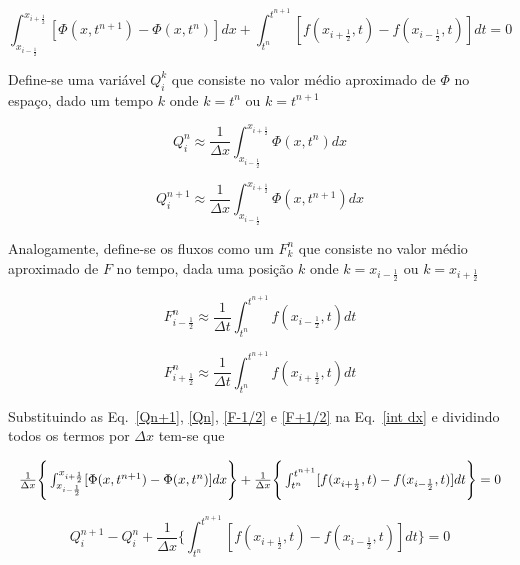 \begin{equation}\label{int dx}
    \int_{x_{i-\frac{1}{2}}}^{x_{i+\frac{1}{2}}}[\Phi(x,t^{n+1}) -
    \Phi(x,t^n)]dx
    +
    \int_{t^n}^{t^{n+1}} [f(x_{i+\frac{1}{2}},t) - f(x_{i-\frac{1}{2}},t)]dt
    = 0
\end{equation}

\noindent Define-se uma variável $Q_i^k$ que consiste no valor médio aproximado
de $\Phi$ no espaço, dado um tempo $k$ onde $k = t^n$ ou $k = t^{n+1}$

\begin{equation}\label{Qn+1}
    Q_i^n \approx \frac{1}{\Delta x}
    \int_{x_{i-\frac{1}{2}}}^{x_{i+\frac{1}{2}}} \Phi(x,t^n)dx
\end{equation}

\begin{equation}\label{Qn}
    Q_i^{n+1} \approx \frac{1}{\Delta x}
    \int_{x_{i-\frac{1}{2}}}^{x_{i+\frac{1}{2}}} \Phi(x,t^{n+1})dx
\end{equation}

\noindent Analogamente, define-se os fluxos como um $F_k^n$ que consiste no
valor médio aproximado de $F$ no tempo, dada uma posição $k$ onde $k =
x_{i-\frac{1}{2}}$ ou $k = x_{i+\frac{1}{2}}$

\begin{equation}\label{F-1/2}
    F_{i-\frac{1}{2}}^n \approx \frac{1}{\Delta t}
    \int_{t^n}^{t^{n+1}} f(x_{i-\frac{1}{2}},t)dt
\end{equation}

\begin{equation}\label{F+1/2}
    F_{i+\frac{1}{2}}^n \approx \frac{1}{\Delta t}
    \int_{t^n}^{t^{n+1}} f(x_{i+\frac{1}{2}},t)dt
\end{equation}

\noindent Substituindo as Eq.\ \ref{Qn+1}, \ref{Qn}, \ref{F-1/2} e \ref{F+1/2}
na Eq.\ \ref{int dx} e dividindo todos os termos por $\Delta x$ tem-se que

\[
    \resizebox{\textwidth}{!}
    {$
    \frac{1}{\Delta x} \Bigg\{
    \int_{x_{i-\frac{1}{2}}}^{x_{i+\frac{1}{2}}}[\Phi(x,t^{n+1}) -
    \Phi(x,t^n)]dx
    \Bigg\}
    +
    \frac{1}{\Delta x} \Bigg\{
    \int_{t^n}^{t^{n+1}} [f(x_{i+\frac{1}{2}},t) - f(x_{i-\frac{1}{2}},t)]dt
    \Bigg\}
    = 0
    $}
\]

\[
    Q_i^{n+1} - Q_i^n + \frac{1}{\Delta x} \Bigg\{
    \int_{t^n}^{t^{n+1}} [f(x_{i+\frac{1}{2}},t) - f(x_{i-\frac{1}{2}},t)]dt
    \Bigg\}
    = 0
\]

